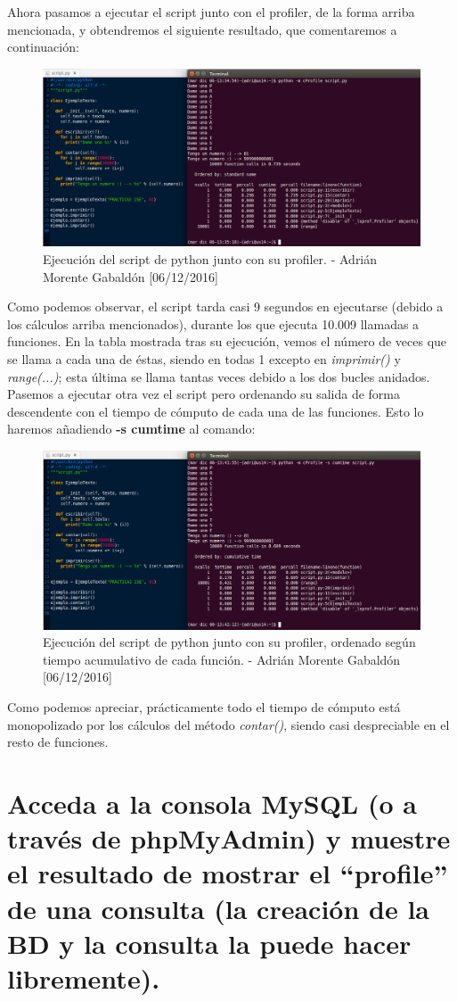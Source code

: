 Ahora pasamos a ejecutar el script junto con el profiler, de la forma arriba mencionada, y obtendremos el siguiente resultado, que comentaremos a continuación:
\begin{figure}[H]
	\centering
	\includegraphics[scale=0.4]{python-cprofile}
	\caption{Ejecución del script de python junto con su profiler. - Adrián Morente Gabaldón [06/12/2016]}
	\label{figura7}
\end{figure}
Como podemos observar, el script tarda casi 9 segundos en ejecutarse (debido a los cálculos arriba mencionados), durante los que ejecuta 10.009 llamadas a funciones. En la tabla mostrada tras su ejecución, vemos el número de veces que se llama a cada una de éstas, siendo en todas 1 excepto en \emph{imprimir()} y \emph{range(...)}; esta última se llama tantas veces debido a los dos bucles anidados. Pasemos a ejecutar otra vez el script pero ordenando su salida de forma descendente con el tiempo de cómputo de cada una de las funciones. Esto lo haremos añadiendo \textbf{-s cumtime} al comando:
\begin{figure}[H]
	\centering
	\includegraphics[scale=0.4]{python-cumtime}
	\caption{Ejecución del script de python junto con su profiler, ordenado según tiempo acumulativo de cada función. - Adrián Morente Gabaldón [06/12/2016]}
	\label{figura8}
\end{figure}
Como podemos apreciar, prácticamente todo el tiempo de cómputo está monopolizado por los cálculos del método \emph{contar()}, siendo casi despreciable en el resto de funciones.

\section{Acceda a la consola MySQL (o a través de phpMyAdmin) y muestre el resultado de mostrar el ``profile'' de una consulta (la creación de la BD y la consulta la puede hacer libremente).}





